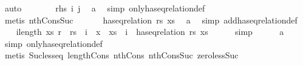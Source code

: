 \begin{isabellebody}
\ auto\isanewline
\ \ \ \ \isamarkupfalse%
\ \isamarkupfalse%
\ {\isachardoublequoteopen}{\isacharquery}{\kern0pt}rhs\ i\ j{\isachardoublequoteclose}\ \isamarkupfalse%
\ a\ \isamarkupfalse%
\ {\isacharparenleft}{\kern0pt}simp\ only{\isacharcolon}{\kern0pt}has{\isacharunderscore}{\kern0pt}eq{\isacharunderscore}{\kern0pt}relation{\isacharunderscore}{\kern0pt}def{\isacharparenright}{\kern0pt}\ \isanewline
\ \ \ \ \ \ \isamarkupfalse%
\ {\isacharparenleft}{\kern0pt}metis\ nth{\isacharunderscore}{\kern0pt}Cons{\isacharunderscore}{\kern0pt}Suc{\isacharparenright}{\kern0pt}\isanewline
\ \ \isamarkupfalse%
\isanewline
\ \ \isamarkupfalse%
\ {\isachardoublequoteopen}has{\isacharunderscore}{\kern0pt}eq{\isacharunderscore}{\kern0pt}relation\ rs\ xs{\isachardoublequoteclose}\ \isamarkupfalse%
\ a\ \isamarkupfalse%
\ {\isacharparenleft}{\kern0pt}simp\ add{\isacharcolon}{\kern0pt}has{\isacharunderscore}{\kern0pt}eq{\isacharunderscore}{\kern0pt}relation{\isacharunderscore}{\kern0pt}def{\isacharparenright}{\kern0pt}\isanewline
\ \ \isamarkupfalse%
\ {\isachardoublequoteopen}{\isacharparenleft}{\kern0pt}{\isasymforall}i{\isacharless}{\kern0pt}length\ xs{\isachardot}{\kern0pt}\ {\isacharparenleft}{\kern0pt}r\ {\isacharequal}{\kern0pt}\ rs\ {\isacharbang}{\kern0pt}\ i{\isacharparenright}{\kern0pt}\ {\isacharequal}{\kern0pt}\ {\isacharparenleft}{\kern0pt}x\ {\isacharequal}{\kern0pt}\ xs\ {\isacharbang}{\kern0pt}\ i{\isacharparenright}{\kern0pt}{\isacharparenright}{\kern0pt}\ {\isasymand}\ has{\isacharunderscore}{\kern0pt}eq{\isacharunderscore}{\kern0pt}relation\ rs\ xs{\isachardoublequoteclose}\isanewline
\ \ \ \ \isamarkupfalse%
\ simp\isanewline
\ \ \ \ \isamarkupfalse%
\ a\ \isamarkupfalse%
\ {\isacharparenleft}{\kern0pt}simp\ only{\isacharcolon}{\kern0pt}has{\isacharunderscore}{\kern0pt}eq{\isacharunderscore}{\kern0pt}relation{\isacharunderscore}{\kern0pt}def{\isacharparenright}{\kern0pt}\isanewline
\ \ \ \ \isamarkupfalse%
\ {\isacharparenleft}{\kern0pt}metis\ Suc{\isacharunderscore}{\kern0pt}less{\isacharunderscore}{\kern0pt}eq\ length{\isacharunderscore}{\kern0pt}Cons\ nth{\isacharunderscore}{\kern0pt}Cons{\isacharunderscore}{\kern0pt}{}\ nth{\isacharunderscore}{\kern0pt}Cons{\isacharunderscore}{\kern0pt}Suc\ zero{\isacharunderscore}{\kern0pt}less{\isacharunderscore}{\kern0pt}Suc{\isacharparenright}{\kern0pt}\isanewline

\end{isabellebody}
